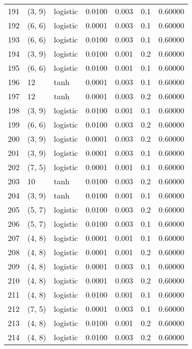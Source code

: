 \begin{tabular}{lllrrrr}
191 &      (3, 9) &  logistic &  0.0100 &  0.003 &  0.1 &   0.60000 \\
192 &      (6, 6) &  logistic &  0.0001 &  0.003 &  0.1 &   0.60000 \\
193 &      (6, 6) &  logistic &  0.0100 &  0.003 &  0.1 &   0.60000 \\
194 &      (3, 9) &  logistic &  0.0100 &  0.001 &  0.2 &   0.60000 \\
195 &      (6, 6) &  logistic &  0.0100 &  0.001 &  0.1 &   0.60000 \\
196 &          12 &      tanh &  0.0001 &  0.003 &  0.1 &   0.60000 \\
197 &          12 &      tanh &  0.0001 &  0.003 &  0.2 &   0.60000 \\
198 &      (3, 9) &  logistic &  0.0100 &  0.001 &  0.1 &   0.60000 \\
199 &      (6, 6) &  logistic &  0.0100 &  0.003 &  0.2 &   0.60000 \\
200 &      (3, 9) &  logistic &  0.0001 &  0.003 &  0.2 &   0.60000 \\
201 &      (3, 9) &  logistic &  0.0001 &  0.003 &  0.1 &   0.60000 \\
202 &      (7, 5) &  logistic &  0.0001 &  0.001 &  0.1 &   0.60000 \\
203 &          10 &      tanh &  0.0100 &  0.003 &  0.2 &   0.60000 \\
204 &      (3, 9) &      tanh &  0.0100 &  0.001 &  0.1 &   0.60000 \\
205 &      (5, 7) &  logistic &  0.0100 &  0.003 &  0.2 &   0.60000 \\
206 &      (5, 7) &  logistic &  0.0100 &  0.003 &  0.1 &   0.60000 \\
207 &      (4, 8) &  logistic &  0.0001 &  0.001 &  0.1 &   0.60000 \\
208 &      (4, 8) &  logistic &  0.0001 &  0.001 &  0.2 &   0.60000 \\
209 &      (4, 8) &  logistic &  0.0001 &  0.003 &  0.1 &   0.60000 \\
210 &      (4, 8) &  logistic &  0.0001 &  0.003 &  0.2 &   0.60000 \\
211 &      (4, 8) &  logistic &  0.0100 &  0.001 &  0.1 &   0.60000 \\
212 &      (7, 5) &  logistic &  0.0001 &  0.003 &  0.1 &   0.60000 \\
213 &      (4, 8) &  logistic &  0.0100 &  0.001 &  0.2 &   0.60000 \\
214 &      (4, 8) &  logistic &  0.0100 &  0.003 &  0.2 &   0.60000 \\

\end{tabular}
